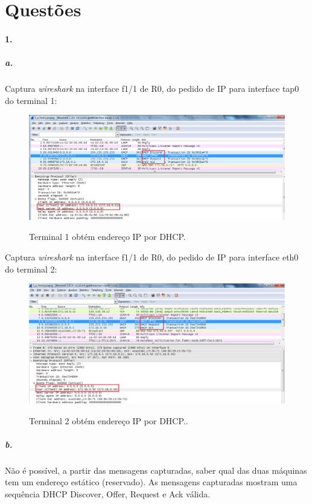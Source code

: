 \section*{Questões}
\paragraph{1.}

\subparagraph{a.}
Captura \emph{wireshark} na interface f1/1 de \textsf{R0}, do pedido de IP para interface \textsf{tap0} do \textsf{terminal 1}:

\begin{figure}[h]
\centering
\includegraphics[width=1\textwidth, height=0.3\textheight]{1_a_Terminal1.png}
\label{fig:Term1 DHCP}
\caption{Terminal 1 obtém endereço IP por DHCP.}
\end{figure}

Captura \emph{wireshark} na interface f1/1 de \textsf{R0}, do pedido de IP para interface \textsf{eth0 } do \textsf{terminal 2}:

\begin{figure}[h]
\centering
\includegraphics[width=1\textwidth, height=0.33\textheight]{1_a_Terminal2.png}
\label{fig:Term2 DHCP}
\caption{Terminal 2 obtém endereço IP por DHCP..}
\end{figure}


\subparagraph{b.}
Não é possível, a partir das mensagens capturadas, saber qual das duas
máquinas tem um endereço estático (reservado). As mensagens capturadas
mostram uma sequência DHCP Discover, Offer, Request e Ack válida.

